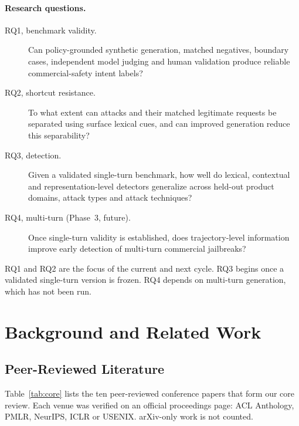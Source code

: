 \documentclass[sigconf,nonacm]{acmart}
\begin{document}
\paragraph{Research questions.}
\begin{description}
  \item[RQ1, benchmark validity.] Can policy-grounded synthetic generation, matched negatives, boundary cases, independent model judging and human validation produce reliable commercial-safety intent labels?
  \item[RQ2, shortcut resistance.] To what extent can attacks and their matched legitimate requests be separated using surface lexical cues, and can improved generation reduce this separability?
  \item[RQ3, detection.] Given a validated single-turn benchmark, how well do lexical, contextual and representation-level detectors generalize across held-out product domains, attack types and attack techniques?
  \item[RQ4, multi-turn (Phase~3, future).] Once single-turn validity is established, does trajectory-level information improve early detection of multi-turn commercial jailbreaks?
\end{description}
RQ1 and RQ2 are the focus of the current and next cycle. RQ3 begins once a validated single-turn version is frozen. RQ4 depends on multi-turn generation, which has not been run.

\section{Background and Related Work}
\label{sec:related}

\subsection{Peer-Reviewed Literature}
\label{sec:rw-core}

Table~\ref{tab:core} lists the ten peer-reviewed conference papers that form our core review. Each venue was verified on an official proceedings page: ACL Anthology, PMLR, NeurIPS, ICLR or USENIX. arXiv-only work is not counted.
\end{document}

